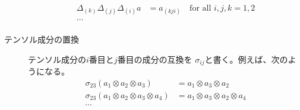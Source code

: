 \begin{description}
\begin{equation*}
\begin{split}
		\Delta_{(k)}\Delta_{(j)}\Delta_{(i)}a &= a_{(kji)} \quad\text{for all }i,j,k=1,2 \\
		\dots \\
	\end{split}\end{equation*} %
	\item[テンソル成分の置換]テンソル成分の$i$番目と$j$番目の成分の互換を
	$\sigma_{ij}$と書く。例えば、次のようになる。
	\begin{equation*}\begin{split} %
		\sigma_{23}(a_1\otimes a_2\otimes a_3) 
		&= a_1\otimes a_3\otimes a_2 \\
		\sigma_{23}(a_1\otimes a_2\otimes a_3\otimes a_4) 
		&= a_1\otimes a_3\otimes a_2\otimes a_4 \\
		\cdots
	\end{split}\end{equation*} %
\end{description} %
